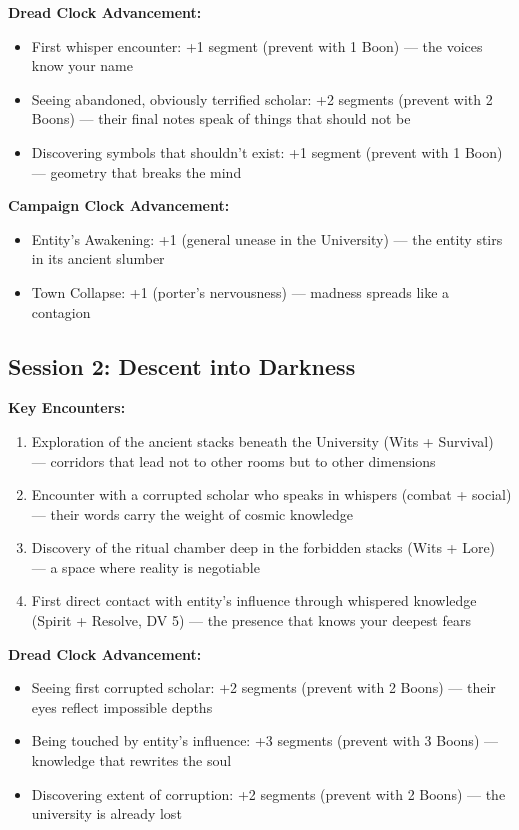 \documentclass[11pt]{article}
\begin{document}
\textbf{Dread Clock Advancement:}
\begin{itemize}
\item First whisper encounter: +1 segment (prevent with 1 Boon) — the voices know your name
\item Seeing abandoned, obviously terrified scholar: +2 segments (prevent with 2 Boons) — their final notes speak of things that should not be
\item Discovering symbols that shouldn't exist: +1 segment (prevent with 1 Boon) — geometry that breaks the mind
\end{itemize}

\textbf{Campaign Clock Advancement:}
\begin{itemize}
\item Entity's Awakening: +1 (general unease in the University) — the entity stirs in its ancient slumber
\item Town Collapse: +1 (porter's nervousness) — madness spreads like a contagion
\end{itemize}

\subsection{Session 2: Descent into Darkness}

\textbf{Key Encounters:}
\begin{enumerate}
\item Exploration of the ancient stacks beneath the University (Wits + Survival) — corridors that lead not to other rooms but to other dimensions
\item Encounter with a corrupted scholar who speaks in whispers (combat + social) — their words carry the weight of cosmic knowledge
\item Discovery of the ritual chamber deep in the forbidden stacks (Wits + Lore) — a space where reality is negotiable
\item First direct contact with entity's influence through whispered knowledge (Spirit + Resolve, DV 5) — the presence that knows your deepest fears
\end{enumerate}

\textbf{Dread Clock Advancement:}
\begin{itemize}
\item Seeing first corrupted scholar: +2 segments (prevent with 2 Boons) — their eyes reflect impossible depths
\item Being touched by entity's influence: +3 segments (prevent with 3 Boons) — knowledge that rewrites the soul
\item Discovering extent of corruption: +2 segments (prevent with 2 Boons) — the university is already lost
\end{itemize}
\end{document}
